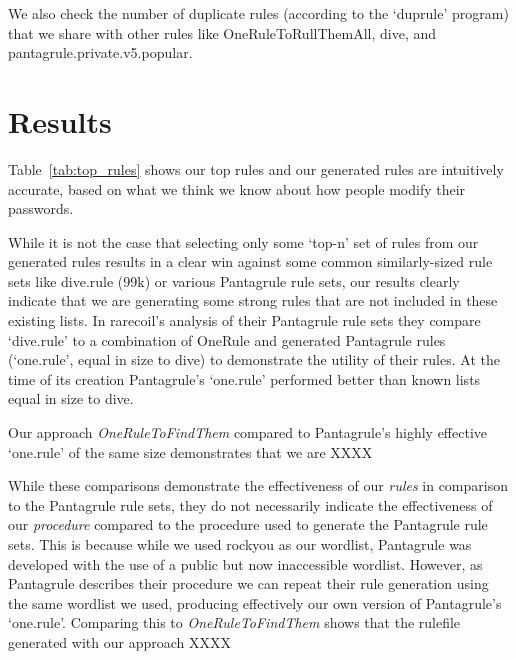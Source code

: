 \documentclass[letterpaper,twocolumn,10pt]{article}
\begin{document}
We also check the number of duplicate rules (according to the `duprule' program) that we share with other rules like OneRuleToRullThemAll, dive, and pantagrule.private.v5.popular.

\section{Results}

Table~\ref{tab:top_rules} shows our top rules and our generated rules are
intuitively accurate, based on what we think we know about how people
modify their passwords.

While it is not the case that selecting only some `top-n' set of rules from our
generated rules results in a clear win against some common similarly-sized rule sets
like dive.rule (99k) or various Pantagrule rule sets, our results clearly
indicate that we are generating some strong rules that are not included in these
existing lists. In rarecoil's analysis of their Pantagrule rule sets they compare
`dive.rule' to a combination of OneRule and generated Pantagrule rules (`one.rule', equal in size to dive)
to demonstrate the utility of their rules. At the time of its
creation Pantagrule's `one.rule' performed better than known lists equal in size to dive.

Our approach \textit{OneRuleToFindThem} compared to Pantagrule's highly effective `one.rule' of
the same size demonstrates that we are XXXX

While these comparisons demonstrate the effectiveness of our \textit{rules} in comparison to the Pantagrule
rule sets, they do not necessarily indicate the effectiveness of our \textit{procedure} compared to
the procedure used to generate the Pantagrule rule sets. This is because while we used rockyou as
our wordlist, Pantagrule was developed with the use of a public but now inaccessible wordlist.
However, as Pantagrule describes their procedure we can repeat their rule generation using
the same wordlist we used, producing effectively our own version of Pantagrule's `one.rule'. Comparing
this to \textit{OneRuleToFindThem} shows that the rulefile generated with our approach XXXX
\end{document}
